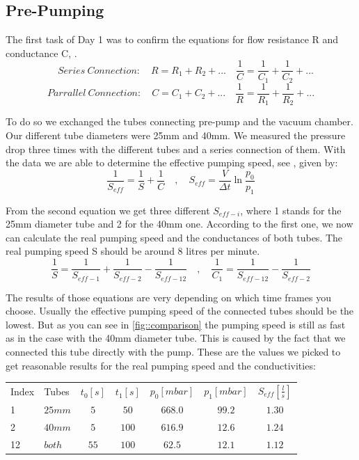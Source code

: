 \documentclass[]{article}
\begin{document}
\subsection{Pre-Pumping}
The first task of Day 1 was to confirm the equations for flow resistance R and conductance C, \cite[Page 91]{VacuumHandbook}. 
\[ \quad Series \: Connection: \quad
R = R_1 + R_2 + ...  \quad \frac{1}{C} = \frac{1}{C_1} + \frac{1}{C_2} + ... \]
\[ Parrallel \: Connection: \quad
C = C_1 + C_2 + ...  \quad \frac{1}{R} = \frac{1}{R_1} + \frac{1}{R_2} + ... \]

To do so we exchanged the tubes connecting pre-pump and the vacuum chamber. Our different tube diameters were 25mm and 40mm. We measured the pressure drop three times with the different tubes and a series connection of them. With the data we are able to determine the effective pumping speed, see \cite[Page 93]{VacuumHandbook}, given by:
\[ \frac{1}{S_{eff}} = \frac{1}{S} + \frac{1}{C} \quad , \quad
S_{eff} = \frac{V}{\Delta t} \ln{ \frac{p_0}{p_1} } \]

From the second equation we get three different $S_{eff-i}$, where 1 stands for the 25mm diameter tube and 2 for the 40mm one. According to the first one, we now can calculate the real pumping speed and the conductances of both tubes. The real pumping speed S should be around 8 litres per minute.
\[ \frac{1}{S} = \frac{1}{S_{eff-1}} + \frac{1}{S_{eff-2}} -\frac{1}{S_{eff-12}} \quad , \quad
\frac{1}{C_1} = \frac{1}{S_{eff-12}} - \frac{1}{S_{eff-2}} \]

The results of those equations are very depending on which time frames you choose. Usually the effective pumping speed of the connected tubes should be the lowest. But as you can see in \ref{fig::comparison} the pumping speed is still as fast as in the case with the 40mm diameter tube. This is caused by the fact that we connected this tube directly with the pump. These are the values we picked to get reasonable results for the real pumping speed and the conductivities:

\begin{table}[h]
\centering
\begin{tabular}{llccccc}
Index & Tubes & $t_0 [s]$ & $t_1 [s]$ & $p_0 [mbar]$ & $p_1 [mbar]$ & $S_{eff} [ \frac{l}{s}]$ \\
1 & $25 mm$ & $5$ & $50$ & $668.0$ & $99.2$ & $1.30$  \\
2 & $40 mm$ & $5$ & $100$ & $616.9$ & $12.6$ & $1.24$  \\
12 & $both$ & $55$ & $100$ & $62.5$ & $12.1$ & $1.12$ 
\end{tabular} 
\end{table}
\end{document}
